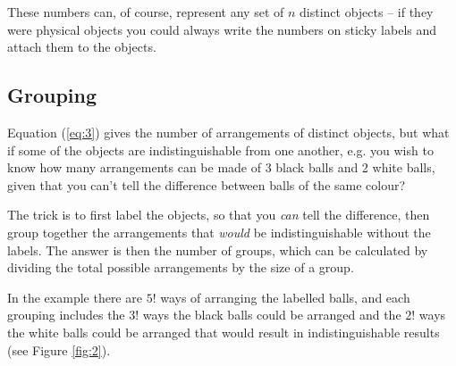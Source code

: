 \documentclass[a5paper]{article}
\begin{document}
These numbers can, of course, represent any set of $n$ distinct objects -- if
they were physical objects you could always write the numbers on sticky labels
and attach them to the objects.

\subsection{Grouping}

Equation (\ref{eq:3}) gives the number of arrangements of distinct objects, but
what if some of the objects are indistinguishable from one another, e.g. you
wish to know how many arrangements can be made of 3 black balls and 2 white
balls, given that you can't tell the difference between balls of the same
colour?

The trick is to first label the objects, so that you \textit{can} tell the
difference, then group together the arrangements that \textit{would} be
indistinguishable without the labels. The answer is then the number of groups,
which can be calculated by dividing the total possible arrangements by the size
of a group.

In the example there are $5!$ ways of arranging the labelled balls, and each
grouping includes the $3!$ ways the black balls could be arranged and the $2!$
ways the white balls could be arranged that would result in indistinguishable
results (see Figure \ref{fig:2}).
\end{document}
